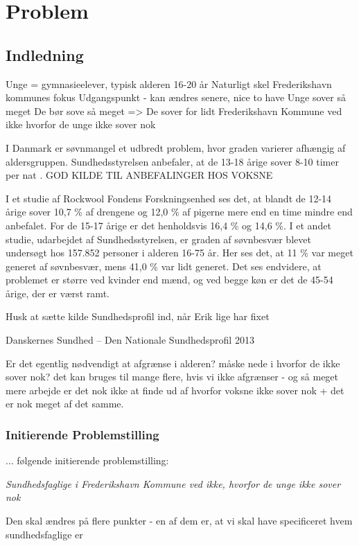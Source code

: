 \part{Problem}

\chapter{Indledning}


Unge = gymnasieelever, typisk alderen 16-20 år
Naturligt skel
Frederikshavn kommunes fokus 
Udgangspunkt - kan ændres senere, nice to have 
Unge sover så meget
De bør sove så meget
=> De sover for lidt
Frederikshavn Kommune ved ikke hvorfor de unge ikke sover nok



I Danmark er søvnmangel et udbredt problem, hvor graden varierer afhængig af aldersgruppen. Sundhedsstyrelsen anbefaler, at de 13-18 årige sover 8-10 timer per nat \cite{Sundhedsstyrrelsen2011}. GOD KILDE TIL ANBEFALINGER HOS VOKSNE  


I et studie af Rockwool Fondens Forskningsenhed ses det, at blandt de 12-14 årige sover 10,7 \% af drengene og 12,0 \% af pigerne mere end en time mindre end anbefalet. For de 15-17 årige er det henholdsvis 16,4 \% og 14,6 \%.\cite{Bonke2013} I et andet studie, udarbejdet af Sundhedsstyrelsen, er graden af søvnbesvær blevet undersøgt hos 157.852 personer i alderen 16-75 år. Her ses det, at 11 \% var meget generet af søvnbesvær, mens 41,0 \% var lidt generet. Det ses endvidere, at problemet er større ved kvinder end mænd, og ved begge køn er det de 45-54 årige, der er værst ramt.\cite{Sundhedsprofil2013} 


Husk at sætte kilde Sundhedsprofil ind, når Erik lige har fixet

Danskernes Sundhed – Den Nationale Sundhedsprofil 2013


Er det egentlig nødvendigt at afgrænse i alderen?
måske nede i hvorfor de ikke sover nok?
det kan bruges til mange flere, hvis vi ikke afgrænser - og så meget mere arbejde er det nok ikke at finde ud af hvorfor voksne ikke sover nok + det er nok meget af det samme. 

\section{Initierende Problemstilling}



... følgende initierende problemstilling:
\begin{center}
\textit{Sundhedsfaglige i Frederikshavn Kommune ved ikke, hvorfor de unge ikke sover nok}

Den skal ændres på flere punkter - en af dem er, at vi skal have specificeret hvem sundhedsfaglige er

\end{center}